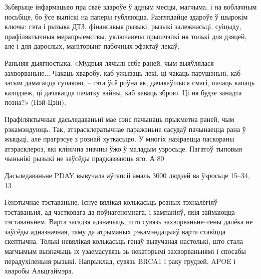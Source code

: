 Зьбярыце інфармацыю пра сваё здароўе ў адным месцы, магчыма, і на воблачным носьбіце, бо ўсе выпіскі на паперы губляюцца. Разглядайце здароўе ў шырокім ключы: гэта і рызыка ДТЗ, фінансавыя рызыкі, рызыкі залежнасьці, суіцыду, прафіляктычныя мерапрыемствы, уключаючы прышчэпкі ня толькі для дзяцей, але і для дарослых, маніторынг пабочных эфэктаў лекаў.

Раньняя дыягностыка. «Мудрыя лячылі сябе раней, чым выяўлялася захворваньне... Чакаць хваробу, каб ужываць лекі, ці чакаць парушэньні, каб затым дамагацца супакою, – гэта ўсё роўна як, дачакаўшыся смагі, пачаць капаць калодзеж, ці дачакацца пачатку вайны, каб каваць зброю. Ці ня будзе занадта позна?» (Нэй-Цзін).

Прафіляктычныя дасьледаваньні мае сэнс пачынаць прыкметна раней, чым рэкамэндуюць. Так, атэрасклератычнае паражэньне сасудаў пачынаецца рана ў жыцьці, але прагрэсуе з рознай хуткасьцю. У многіх назіраецца паскораны атэрасклероз, які клінічна значны ўжо ў маладым узросьце. Пагатоў тыповыя чыньнікі рызыкі не заўсёды прадказваюць яго. А 80%

Дасьледаваньне PDAY вывучала аўтапсіі амаль 3000 людзей ва ўзросьце 15--34, 13%

Генэтычнае тэставаньне. Існуе вялікая колькасьць розных тэхналёгіяў тэставаньня, ад частковага да поўнагеномнага, і кампаніяў, якія займаюцца тэставаньнем. Варта загадзя адзначыць, што сувязь захворваньне--гены далёка не заўсёды адназначная, таму да атрыманых рэкамэндацыяў варта ставіцца скептычна. Толькі невялікая колькасьць генаў вывучаная настолькі, што стала магчымым вызначыць іх узаемасувязь зь некаторымі захворваньнямі і спосабы перадухіленьня рызыкі. Напрыклад, сувязь BRCA1 і раку грудзей, APOE і хваробы Альцгаймэра.

